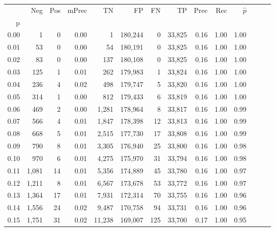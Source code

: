\begin{tabular}{rrrrrrrrrrrrrr}
\toprule
{} &    Neg &  Pos & mPrec &       TN &       FP &      FN &      TP &  Prec &   Rec & $\hat{p}$ \\
p    &        &      &       &          &          &         &         &       &       &           \\
\midrule
0.00 &      1 &    0 &  0.00 &        1 &  180,244 &       0 &  33,825 &  0.16 &  1.00 &      1.00 \\
0.01 &     53 &    0 &  0.00 &       54 &  180,191 &       0 &  33,825 &  0.16 &  1.00 &      1.00 \\
0.02 &     83 &    0 &  0.00 &      137 &  180,108 &       0 &  33,825 &  0.16 &  1.00 &      1.00 \\
0.03 &    125 &    1 &  0.01 &      262 &  179,983 &       1 &  33,824 &  0.16 &  1.00 &      1.00 \\
0.04 &    236 &    4 &  0.02 &      498 &  179,747 &       5 &  33,820 &  0.16 &  1.00 &      1.00 \\
0.05 &    314 &    1 &  0.00 &      812 &  179,433 &       6 &  33,819 &  0.16 &  1.00 &      1.00 \\
0.06 &    469 &    2 &  0.00 &    1,281 &  178,964 &       8 &  33,817 &  0.16 &  1.00 &      0.99 \\
0.07 &    566 &    4 &  0.01 &    1,847 &  178,398 &      12 &  33,813 &  0.16 &  1.00 &      0.99 \\
0.08 &    668 &    5 &  0.01 &    2,515 &  177,730 &      17 &  33,808 &  0.16 &  1.00 &      0.99 \\
0.09 &    790 &    8 &  0.01 &    3,305 &  176,940 &      25 &  33,800 &  0.16 &  1.00 &      0.98 \\
0.10 &    970 &    6 &  0.01 &    4,275 &  175,970 &      31 &  33,794 &  0.16 &  1.00 &      0.98 \\
0.11 &  1,081 &   14 &  0.01 &    5,356 &  174,889 &      45 &  33,780 &  0.16 &  1.00 &      0.97 \\
0.12 &  1,211 &    8 &  0.01 &    6,567 &  173,678 &      53 &  33,772 &  0.16 &  1.00 &      0.97 \\
0.13 &  1,364 &   17 &  0.01 &    7,931 &  172,314 &      70 &  33,755 &  0.16 &  1.00 &      0.96 \\
0.14 &  1,556 &   24 &  0.02 &    9,487 &  170,758 &      94 &  33,731 &  0.16 &  1.00 &      0.96 \\
0.15 &  1,751 &   31 &  0.02 &   11,238 &  169,007 &     125 &  33,700 &  0.17 &  1.00 &      0.95 \\

\end{tabular}
